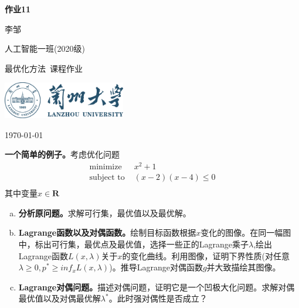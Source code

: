 \documentclass[10pt, a4paper]{article}
\newcommand\course{最优化方法}                         %
\begin{document}
\begin{titlepage}
    \begin{center}
        \vspace*{3.5cm}
            
        \Huge
        \textbf{作业11}
            
        \vspace{2cm}
        \LARGE
        李邹
            
        \vspace{0.1cm}
        \Large
        人工智能一班(2020级)                      %
        
            
        \vfill
        
        \course \ 课程作业
            
        \vspace{1cm}
            
        \includegraphics[width=0.4\textwidth]{lzu-logo.png}
        \\
        
        \Large
        
        \today
            
    \end{center}
\end{titlepage}


\newpage
\begin{Problem}
    \textbf{一个简单的例子。}\;考虑优化问题
    $$
    \begin{array}{ll}
    \operatorname{minimize} & x^{2}+1  \\
    \text {subject to } & (x-2)(x-4) \le 0 \\
    \end{array}
    $$
    其中变量$x\in \textbf{R}$
    \begin{enumerate}[(a)]
       \item \textbf{分析原问题。}求解可行集，最优值以及最优解。
       \item \textbf{Lagrange函数以及对偶函数。}绘制目标函数根据$x$变化的图像。在同一幅图中，标出可行集，最优点及最优值，选择一些正的Lagrange乘子$\lambda $,绘出Lagrange函数$L(x,\lambda)$关于$x$的变化曲线。利用图像，证明下界性质(对任意$\lambda \ge 0,p^{*} \ge inf_{x}L(x,\lambda)$)。推导Lagrange对偶函数$g$并大致描绘其图像。
       \item \textbf{Lagrange对偶问题。}描述对偶问题，证明它是一个凹极大化问题。求解对偶最优值以及对偶最优解$\lambda^{*}$。此时强对偶性是否成立？
    \end{enumerate}
\end{Problem}
    
\end{document}
